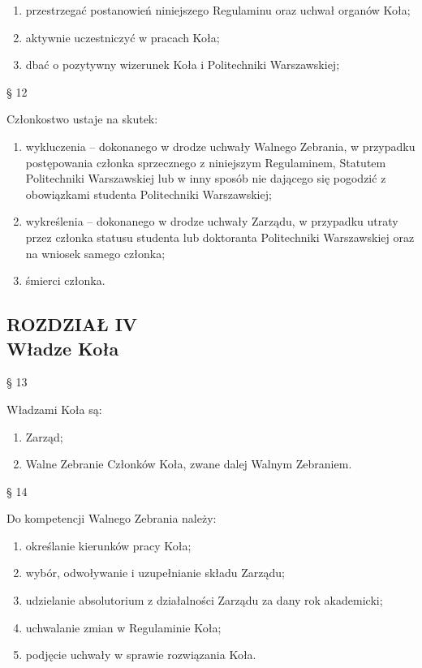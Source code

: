 \documentclass[a4paper,11pt]{article}
\renewcommand{\paragraph}[1] {\begin{center}§ {#1}\end{center}}
\newcommand{\content}[1] {\begin{flushleft}{#1}\end{flushleft}}
\newcommand{\chapter}[2] {\begin{center}\section*{ROZDZIAŁ {#1} \\ {#2}}\end{center}}
\begin{document}
\begin{enumerate}
	\item przestrzegać postanowień niniejszego Regulaminu oraz uchwał organów Koła;
	\item aktywnie uczestniczyć w pracach Koła;
	\item dbać o pozytywny wizerunek Koła i Politechniki Warszawskiej;
\end{enumerate}

\paragraph{12}
\content{Członkostwo ustaje na skutek:}
\begin{enumerate}
	\item wykluczenia  –  dokonanego  w  drodze  uchwały  Walnego  Zebrania,  w  przypadku
postępowania  członka  sprzecznego  z  niniejszym  Regulaminem,  Statutem  Politechniki
Warszawskiej  lub w  inny sposób nie  dającego się  pogodzić z  obowiązkami  studenta
Politechniki Warszawskiej;
	\item wykreślenia – dokonanego w drodze uchwały Zarządu, w przypadku utraty przez członka
statusu  studenta  lub  doktoranta  Politechniki  Warszawskiej  oraz  na  wniosek  samego
członka;
	\item śmierci członka.
\end{enumerate}

\chapter{IV}{Władze Koła}

\paragraph{13}
\content{Władzami Koła są:}
\begin{enumerate}
	\item Zarząd;
	\item Walne Zebranie Członków Koła, zwane dalej Walnym Zebraniem.
\end{enumerate}

\paragraph{14}
\content{Do kompetencji Walnego Zebrania należy:}
\begin{enumerate}
	\item określanie kierunków pracy Koła;
	\item wybór, odwoływanie i uzupełnianie składu Zarządu;
	\item udzielanie absolutorium z działalności Zarządu za dany rok akademicki;
	\item uchwalanie zmian w Regulaminie Koła;
	\item podjęcie uchwały w sprawie rozwiązania Koła.
\end{enumerate}
\end{document}
